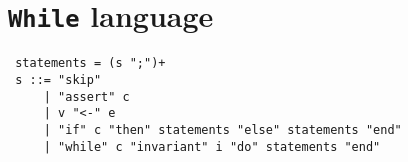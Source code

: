 \section{\texttt{While} language} %

\begin{lstlisting}
 statements = (s ";")+
 s ::= "skip"
     | "assert" c
     | v "<-" e
     | "if" c "then" statements "else" statements "end"
     | "while" c "invariant" i "do" statements "end"
\end{lstlisting}

